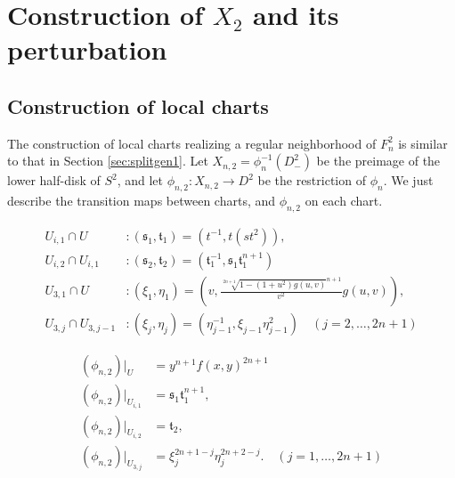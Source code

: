 \documentclass[10pt,a4paper,reqno]{amsart}
\theoremstyle{definition}
\numberwithin{equation}{section}
\numberwithin{figure}{section}
\newcommand{\arrowr}{\rightarrow}
\begin{document}
\section{Construction of $X_2$ and its perturbation}\label{sec:splitgen2}
\subsection{Construction of local charts}
The construction of local charts realizing a regular neighborhood of $F^2_{n}$ is similar to that in Section \ref{sec:splitgen1}.
Let $X_{n,2}= \phi^{-1}_{n}(D^2_-)$ be the preimage of the lower half-disk of $S^2$, and
let $\phi_{n,2}: X_{n,2} \arrowr D^2$ be the restriction of $\phi_{n}$.
We just describe the transition maps between charts, and $\phi_{n,2}$ on each chart.

\begin{equation} \label{eq:chart2}
    \begin{aligned}
    U_{i,1}\cap U&: (\mathfrak{s}_1, \mathfrak{t}_1)=(t^{-1}, t(st^2)), \\
    U_{i,2} \cap U_{i,1}&:(\mathfrak{s}_2, \mathfrak{t}_2)=(\mathfrak{t}_{1}^{-1}, \mathfrak{s}_{1}\mathfrak{t}_{1}^{n+1})\\
    U_{3,1} \cap U&: (\xi_1,\eta_1)=\left(v, \frac{\sqrt[2n+1]{1-(1+u^2)g(u,v)}^{n+1}}{v^2} g(u,v)\right),\\
    U_{3,j}\cap U_{3,j-1}&: (\xi_j, \eta_j)=(\eta_{j-1}^{-1}, \xi_{j-1} \eta_{j-1}^2) \quad (j=2,\dots, 2n+1)
    \end{aligned}
\end{equation}

\begin{equation} \label{eq:phi2}
    \begin{aligned}
    (\phi_{n,2})|_U&=y^{n+1} f(x,y)^{2n+1}\\
    (\phi_{n,2})|_{U_{i,1}}&=\mathfrak{s}_1\mathfrak{t}_1^{n+1},\\
    (\phi_{n,2})|_{U_{i,2}}&=\mathfrak{t}_2, \\
    (\phi_{n,2})|_{U_{3,j}}&=\xi_j^{2n+1-j} \eta_j^{2n+2-j}. \quad (j=1,\dots, 2n+1)
    \end{aligned}
\end{equation}
\end{document}
